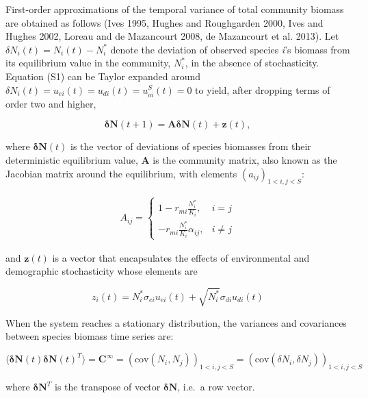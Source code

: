 \documentclass[12pt,]{article}
\begin{document}
First-order approximations of the temporal variance of total community
biomass are obtained as follows (Ives 1995, Hughes and Roughgarden 2000,
Ives and Hughes 2002, Loreau and {{de Mazancourt}} 2008, {{de
Mazancourt}} et al. 2013). Let \(\delta N_i(t) = N_i(t) - N^*_i\) denote
the deviation of observed species \emph{i}'s biomass from its
equilibrium value in the community, \(N^*_i\), in the absence of
stochasticity. Equation (S1) can be Taylor expanded around
\(\delta N_i(t) = u_{ei}(t) = u_{di}(t) = u^S_{oi}(t) = 0\) to yield,
after dropping terms of order two and higher,

\begin{equation}
\boldsymbol{\delta}\textbf{N}(t+1) = \textbf{A}\boldsymbol{\delta}\textbf{N}(t) + \textbf{z}(t),
\end{equation}

\noindent where \(\boldsymbol{\delta}\textbf{N}(t)\) is the vector of
deviations of species biomasses from their deterministic equilibrium
value, \textbf{A} is the community matrix, also known as the Jacobian
matrix around the equilibrium, with elements \((a_{ij})_{1<i,j<S}\):

\begin{align}
A_{ij} = 
  \begin{cases}
      1-r_{mi} \frac{N_{i}^*}{K_i}, & i=j \\
      -r_{mi} \frac{N_{i}^*}{K_i} \alpha_{ij}, & i \neq j
    \end{cases}
\end{align}

\noindent and \(\textbf{z}(t)\) is a vector that encapsulates the
effects of environmental and demographic stochasticity whose elements
are

\begin{equation}
z_i(t) = N^*_i \sigma_{ei} u_{ei}(t) + \sqrt{N^*_i} \sigma_{di} u_{di}(t)
\end{equation}

When the system reaches a stationary distribution, the variances and
covariances between species biomass time series are:

\begin{equation}
\big\langle \boldsymbol{\delta}\textbf{N}(t) \boldsymbol{\delta}\textbf{N}(t)^T \big\rangle = \textbf{C}^\infty = (\text{cov}(N_i,N_j))_{1<i,j<S} = (\text{cov}(\delta N_i, \delta N_j))_{1<i,j<S}
\end{equation}

\noindent where \(\boldsymbol{\delta}\textbf{N}^T\) is the transpose of
vector \(\boldsymbol{\delta}\textbf{N}\), i.e.~a row vector.
\end{document}
